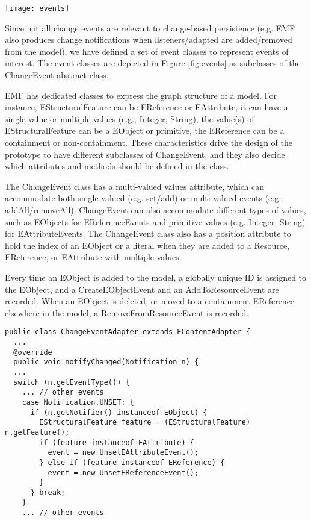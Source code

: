 \begin{figure*}[th]
  \centering
  \texttt{[image: events]}
  \caption{Event classes to represent changes of models.}
  \label{fig:events}
\end{figure*}

Since not all change events are relevant to change-based persistence (e.g. EMF also produces change notifications when listeners/adapted are added/removed from the model), we have defined a set of event classes to represent events of interest. The event classes are depicted in Figure \ref{fig:events} as subclasses of the \textsf{ChangeEvent} abstract class.

EMF has dedicated classes to express the graph structure of a model. For instance, \textsf{EStructuralFeature} can be \textsf{EReference} or \textsf{EAttribute}, it can have a single value or multiple values (e.g., Integer, String), the value(s) of \textsf{EStructuralFeature} can be a \textsf{EObject} or primitive, the \textsf{EReference} can be a containment or non-containment. These characteristics drive the design of the prototype to have different subclasses of \textsf{ChangeEvent}, and they also decide which attributes and methods should be defined in the class.

The \textsf{ChangeEvent} class has a multi-valued \textsf{values} attribute, which can accommodate both single-valued (e.g. set/add) or multi-valued events (e.g. addAll/removeAll). \textsf{ChangeEvent} can also accommodate different types of values, such as \textsf{EObject}s for \textsf{EReferenceEvents} and primitive values (e.g. Integer, String) for \textsf{EAttributeEvents}. The \textsf{ChangeEvent} class also has a position attribute to hold the index of an \textsf{EObject} or a literal when they are added to a \textsf{Resource}, \textsf{EReference}, or \textsf{EAttribute} with multiple values.

Every time an \textsf{EObject} is added to the model, a globally unique ID is assigned to the \textsf{EObject}, and a \textsf{CreateEObjectEvent} and an \textsf{AddToResourceEvent} are recorded. When an EObject is deleted, or moved to a containment \textsf{EReference} elsewhere in the model, a \textsf{RemoveFromResourceEvent} is recorded.

\begin{lstlisting}[style=java,caption={Simplified Java code to handle notification events.},label=lst:javacode]
public class ChangeEventAdapter extends EContentAdapter {
  ...
  @override
  public void notifyChanged(Notification n) {
  ...
  switch (n.getEventType()) {
    ... // other events
    case Notification.UNSET: {
      if (n.getNotifier() instanceof EObject) {
        EStructuralFeature feature = (EStructuralFeature) n.getFeature();
        if (feature instanceof EAttribute) {
          event = new UnsetEAttributeEvent();
        } else if (feature instanceof EReference) {
          event = new UnsetEReferenceEvent();
        }
      } break;
    }
    ... // other events
\end{lstlisting}	

